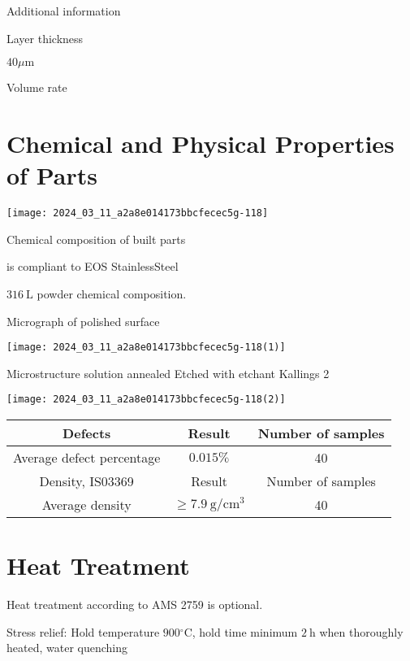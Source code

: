 \documentclass[10pt]{article}
\begin{document}
Additional information

Layer thickness

$40 \mu \mathrm{m}$

Volume rate

\section*{Chemical and Physical Properties of Parts}
\begin{center}
\texttt{[image: 2024\_03\_11\_a2a8e014173bbcfecec5g-118]}
\end{center}

Chemical composition of built parts

is compliant to EOS StainlessSteel

$316 \mathrm{~L}$ powder chemical composition.

Micrograph of polished surface

\begin{center}
\texttt{[image: 2024\_03\_11\_a2a8e014173bbcfecec5g-118(1)]}
\end{center}

Microstructure solution annealed Etched with etchant Kallings 2

\begin{center}
\texttt{[image: 2024\_03\_11\_a2a8e014173bbcfecec5g-118(2)]}
\end{center}

\begin{center}
\begin{tabular}{|c|c|c|}
\hline
Defects & Result & Number of samples \\
\hline
Average defect percentage & $0.015 \%$ & 40 \\
\hline
Density, IS03369 & Result & Number of samples \\
\hline
Average density & $\geq 7.9 \mathrm{~g} / \mathrm{cm}^{3}$ & 40 \\
\hline
\end{tabular}
\end{center}

\section*{Heat Treatment}
Heat treatment according to AMS 2759 is optional.

Stress relief: Hold temperature $900{ }^{\circ} \mathrm{C}$, hold time minimum $2 \mathrm{~h}$ when thoroughly heated, water quenching
\end{document}
